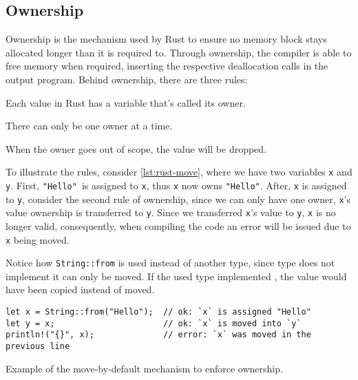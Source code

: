 \subsection{Ownership}\label{sec:rust-lang:ownership}

Ownership is the mechanism used by Rust to ensure no memory block stays allocated longer than it is required to.
Through ownership, the compiler is able to free memory when required,
inserting the respective deallocation calls in the output program.
Behind ownership, there are three rules:

\begin{displayquote}
    \begin{compactitem}
        \item Each value in Rust has a variable that’s called its owner.
        \item There can only be one owner at a time.
        \item When the owner goes out of scope, the value will be dropped.
    \end{compactitem}
\end{displayquote}

To illustrate the rules, consider \autoref{lst:rust-move}, where we have two variables \texttt{x} and \texttt{y}.
First, \texttt{"Hello"}\footnotemark~is assigned to \texttt{x}, thus \texttt{x} now owns \texttt{"Hello"}.
After, \texttt{x} is assigned to \texttt{y}, consider the second rule of ownership, since we can only have one owner,
\texttt{x}'s value ownership is transferred to \texttt{y}.
Since we transferred \texttt{x}'s value to \texttt{y}, \texttt{x} is no longer valid, consequently,
when compiling the code an error will be issued due to \texttt{x} being moved.

Notice how \texttt{String::from} is used instead of another type,
since  type does not implement  it can only be moved.
If the used type implemented , the value would have been copied instead of moved.

\begin{listing}
    \begin{verbatim}
let x = String::from("Hello");  // ok: `x` is assigned "Hello"
let y = x;                      // ok: `x` is moved into `y`
println!("{}", x);              // error: `x` was moved in the previous line
    \end{verbatim}
    \caption{Example of the move-by-default mechanism to enforce ownership.}
    \label{lst:rust-move}
\end{listing}

